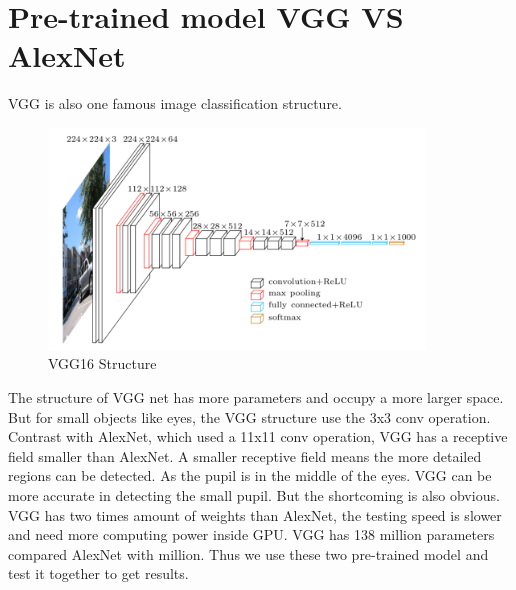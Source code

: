 \documentclass[senior]{IPSstyle}
\begin{document}
\section{Pre-trained model VGG VS AlexNet}
VGG is also one famous image classification structure\cite{simonyan2014very}.
\begin{figure}[h]
    \centering
    \includegraphics[width=10cm]{MasterThesis-master/images/vgg16.png}
    \caption{VGG16 Structure}
    \label{fig:VGG16}
\end{figure}
The structure of VGG net has more parameters and occupy a more larger space.
But for small objects like eyes, the VGG structure use the 3x3 conv operation.
Contrast with AlexNet, which used a 11x11 conv operation, VGG has a receptive field smaller than AlexNet.
A smaller receptive field means the more detailed regions can be detected.
As the pupil is in the middle of the eyes.
VGG can be more accurate in detecting the small pupil.
But the shortcoming is also obvious.
VGG has two times amount of weights than AlexNet, the testing speed is slower and need more computing power inside GPU.
VGG has 138 million parameters compared  AlexNet with million.
Thus we use these two pre-trained model and test it together to get results.

\end{document}

